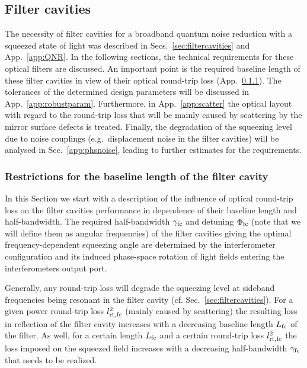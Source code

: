 \FloatBarrier
\subsection{Filter cavities}\label{app:filtercavities}

The necessity of filter cavities for a broadband quantum noise reduction with a squeezed state of light was described in Secs.~\ref{sec:filtercavities} and App.~\ref{app:QNR}. In the following sections, the technical requirements for these optical filters are discussed. An important point is the required baseline length of these filter cavities in view of their optical round-trip loss (App.~\ref{app:FClength}). The tolerances of the determined design parameters will be discussed in App.~\ref{app:robustparam}. Furthermore, in App.~\ref{app:scatter} the optical layout with regard to the round-trip loss that will be mainly caused by scattering by the mirror surface defects is treated. Finally, the degradation of the squeezing level due to noise couplings (e.g.\ displacement noise in the filter cavities) will be analysed in Sec.~\ref{app:phsnoise}, leading to further estimates for the requirements.

\FloatBarrier
\subsubsection{Restrictions for the baseline length of the filter cavity}\label{app:FClength}

In this Section we start with a description of the influence of optical round-trip loss on the filter cavities performance in dependence of their baseline length and half-bandwidth. The required half-bandwidth $\gamma_{\rm fc}$ and detuning
$\Phi_{\rm fc}$ (note that we will define them as angular
frequencies) of the filter cavities giving the optimal frequency-dependent squeezing angle are determined by the interferometer
configuration and its induced phase-space rotation of light fields
entering the interferometers output port.

Generally, any round-trip loss will degrade the squeezing level at
sideband frequencies being resonant in the filter cavity (cf. Sec.~\ref{sec:filtercavities}). For a
given power round-trip loss $l^2_{\rm rt,fc}$
 (mainly caused by
scattering)  the resulting loss in reflection of the filter cavity
increases with a decreasing baseline length $L_{\rm fc}$
 of the
filter. As well, for a certain length  $L_{\rm fc}$ and a certain
round-trip loss $l^2_{\rm rt,fc}$ the loss imposed on the squeezed
field increases with a decreasing half-bandwidth $\gamma_{\rm fc}$
that needs to be realized.

